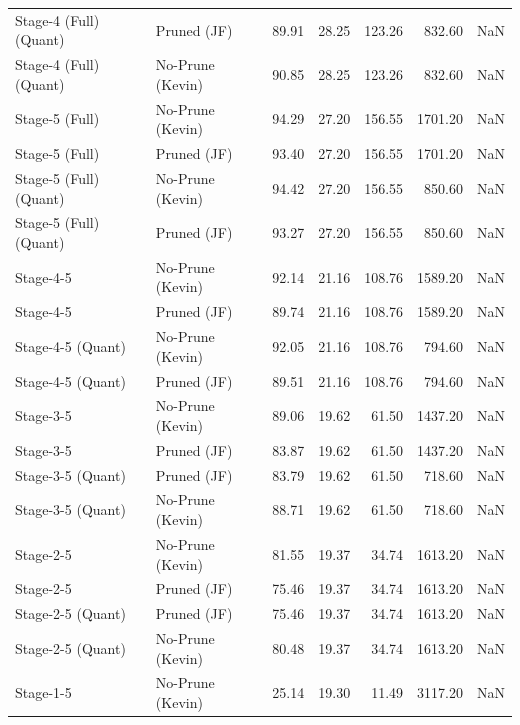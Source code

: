 \begin{table}
\begin{tabular}{llrrrrl}
Stage-4 (Full)
(Quant) & Pruned (JF) & 89.91 & 28.25 & 123.26 & 832.60 & NaN \\
Stage-4 (Full)
(Quant) & No-Prune (Kevin) & 90.85 & 28.25 & 123.26 & 832.60 & NaN \\
Stage-5 (Full) & No-Prune (Kevin) & 94.29 & 27.20 & 156.55 & 1701.20 & NaN \\
Stage-5 (Full) & Pruned (JF) & 93.40 & 27.20 & 156.55 & 1701.20 & NaN \\
Stage-5 (Full)
(Quant) & No-Prune (Kevin) & 94.42 & 27.20 & 156.55 & 850.60 & NaN \\
Stage-5 (Full)
(Quant) & Pruned (JF) & 93.27 & 27.20 & 156.55 & 850.60 & NaN \\
Stage-4-5 & No-Prune (Kevin) & 92.14 & 21.16 & 108.76 & 1589.20 & NaN \\
Stage-4-5 & Pruned (JF) & 89.74 & 21.16 & 108.76 & 1589.20 & NaN \\
Stage-4-5
(Quant) & No-Prune (Kevin) & 92.05 & 21.16 & 108.76 & 794.60 & NaN \\
Stage-4-5
(Quant) & Pruned (JF) & 89.51 & 21.16 & 108.76 & 794.60 & NaN \\
Stage-3-5 & No-Prune (Kevin) & 89.06 & 19.62 & 61.50 & 1437.20 & NaN \\
Stage-3-5 & Pruned (JF) & 83.87 & 19.62 & 61.50 & 1437.20 & NaN \\
Stage-3-5
(Quant) & Pruned (JF) & 83.79 & 19.62 & 61.50 & 718.60 & NaN \\
Stage-3-5
(Quant) & No-Prune (Kevin) & 88.71 & 19.62 & 61.50 & 718.60 & NaN \\
Stage-2-5 & No-Prune (Kevin) & 81.55 & 19.37 & 34.74 & 1613.20 & NaN \\
Stage-2-5 & Pruned (JF) & 75.46 & 19.37 & 34.74 & 1613.20 & NaN \\
Stage-2-5
(Quant) & Pruned (JF) & 75.46 & 19.37 & 34.74 & 1613.20 & NaN \\
Stage-2-5
(Quant) & No-Prune (Kevin) & 80.48 & 19.37 & 34.74 & 1613.20 & NaN \\
Stage-1-5 & No-Prune (Kevin) & 25.14 & 19.30 & 11.49 & 3117.20 & NaN \\
\bottomrule
\end{tabular}
\end{table}

